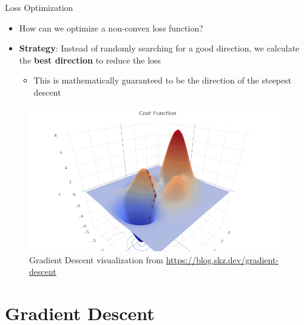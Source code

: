\documentclass[serif, aspectratio=169]{beamer}
\begin{document}
\begin{frame}{Loss Optimization}
    \begin{minipage}{0.5\linewidth}
    \begin{itemize}
        \item How can we optimize a non-convex loss function?
        \item \textbf{Strategy}: Instead of randomly searching for a good direction, we calculate the \textbf{best direction} to reduce the loss
        \begin{itemize}
            \item  This is mathematically guaranteed to be the direction of the steepest descent
        \end{itemize}
    \end{itemize}
    \end{minipage}%
    \begin{minipage}{0.5\linewidth}
        \begin{figure}[h]
            \centering
            \includegraphics[height=.6\textheight]{pic/gradient_descent_blog.skz.dev.png}
            \caption{Gradient Descent visualization from \url{https://blog.skz.dev/gradient-descent}}
        \end{figure}
    \end{minipage}
\end{frame}


\section{Gradient Descent}
\end{document}
